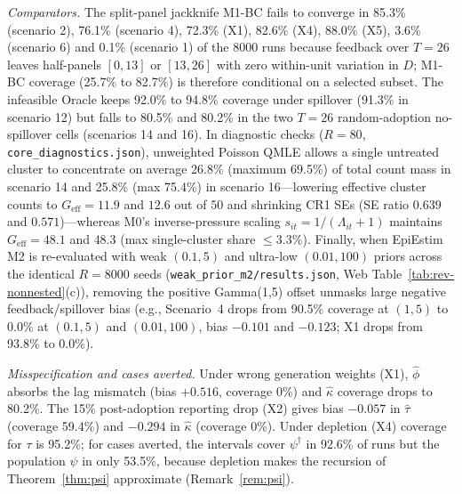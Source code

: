 \emph{Comparators.} The split-panel jackknife M1-BC fails to converge in 85.3\% (scenario 2), 76.1\%
(scenario 4), 72.3\% (X1), 82.6\% (X4), 88.0\% (X5), 3.6\% (scenario 6) and 0.1\% (scenario 1) of the 8000 runs because feedback over $T=26$ leaves half-panels $[0,13]$ or $[13,26]$ with zero within-unit variation in $D$; M1-BC coverage (25.7\% to 82.7\%) is therefore conditional on a selected subset. The infeasible Oracle keeps 92.0\% to 94.8\% coverage under spillover (91.3\% in scenario 12) but falls to 80.5\% and 80.2\% in the two $T=26$ random-adoption no-spillover cells (scenarios 14 and 16). In diagnostic checks ($R=80$, \texttt{core\_diagnostics.json}), unweighted Poisson QMLE allows a single untreated cluster to concentrate on average 26.8\% (maximum 69.5\%) of total count mass in scenario 14 and 25.8\% (max 75.4\%) in scenario 16—lowering effective cluster counts to $G_{\mathrm{eff}}=11.9$ and $12.6$ out of $50$ and shrinking CR1 SEs (SE ratio $0.639$ and $0.571$)—whereas M0's inverse-pressure scaling $s_{it}=1/(\Lambda_{it}+1)$ maintains $G_{\mathrm{eff}}=48.1$ and $48.3$ (max single-cluster share $\le 3.3\%$). Finally, when EpiEstim M2 is re-evaluated with weak $(0.1,5)$ and ultra-low $(0.01,100)$ priors across the identical $R=8000$ seeds (\texttt{weak\_prior\_m2/results.json}, Web Table~\ref{tab:rev-nonnested}(c)), removing the positive Gamma(1,5) offset unmasks large negative feedback/spillover bias (e.g., Scenario~4 drops from 90.5\% coverage at $(1,5)$ to 0.0\% at $(0.1,5)$ and $(0.01,100)$, bias $-0.101$ and $-0.123$; X1 drops from 93.8\% to 0.0\%).

\emph{Misspecification and cases averted.} Under wrong generation weights (X1), $\hat\phi$ absorbs the
lag mismatch (bias $+0.516$, coverage 0\%) and $\hat\kappa$ coverage drops to 80.2\%. The 15\%
post-adoption reporting drop (X2) gives bias $-0.057$ in $\hat\tau$ (coverage 59.4\%) and $-0.294$ in
$\hat\kappa$ (coverage 0\%). Under depletion (X4) coverage for $\tau$ is 95.2\%; for cases averted, the
intervals cover $\psi^\dagger$ in 92.6\% of runs but the population $\psi$ in only 53.5\%, because
depletion makes the recursion of Theorem~\ref{thm:psi} approximate (Remark~\ref{rem:psi}).

